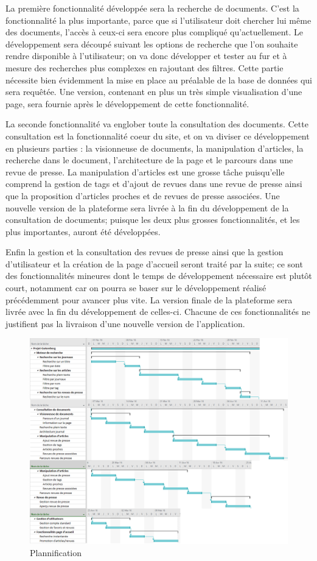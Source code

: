 	La première fonctionnalité développée sera la recherche de documents. C'est la fonctionnalité la plus importante, parce que si l'utilisateur doit chercher lui même des documents, l'accès à ceux-ci sera encore plus compliqué qu'actuellement. Le développement sera découpé suivant les options de recherche que l'on souhaite rendre disponible à l'utilisateur; on va donc développer et tester au fur et à mesure des recherches plus complexes en rajoutant des filtres. Cette partie nécessite bien évidemment la mise en place au préalable de la base de données qui sera requêtée. Une version, contenant en plus un très simple visualisation d'une page, sera fournie après le développement de cette fonctionnalité.

	La seconde fonctionnalité va englober toute la consultation des documents. Cette consultation est la fonctionnalité coeur du site, et on va diviser ce développement en plusieurs parties : la visionneuse de documents, la manipulation d'articles, la recherche dans le document, l'architecture de la page et le parcours dans une revue de presse. La manipulation d'articles est une grosse tâche puisqu'elle comprend la gestion de tags et d'ajout de revues dans une revue de presse ainsi que la proposition d'articles proches et de revues de presse associées. Une nouvelle version de la plateforme sera livrée à la fin du développement de la consultation de documents; puisque les deux plus grosses fonctionnalités, et les plus importantes, auront été développées.

	Enfin la gestion et la consultation des revues de presse ainsi que la gestion d'utilisateur et la création de la page d'accueil seront traité par la suite; ce sont des fonctionnalités mineures dont le temps de développement nécessaire est plutôt court, notamment car on pourra se baser sur le développement réalisé précédemment pour avancer plus vite. La version finale de la plateforme sera livrée avec la fin du développement de celles-ci. Chacune de ces fonctionnalités ne justifient pas la livraison d'une nouvelle version de l'application.

	\begin{figure}[H]
        \centering
        \includegraphics[width=1.3\textwidth, angle=90]{figures/plan.png}
            \caption{Plannification}
            \label{fig:plan_recherche}
    \end{figure}